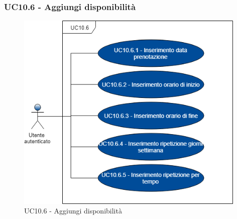 \subsubsection{UC10.6 - Aggiungi disponibilità}
\begin{figure}[H]
	\includegraphics[width=11cm]{res/images/UC11Aggiungi.png}
	\centering
	\caption{UC10.6 - Aggiungi disponibilità}
\end{figure}
